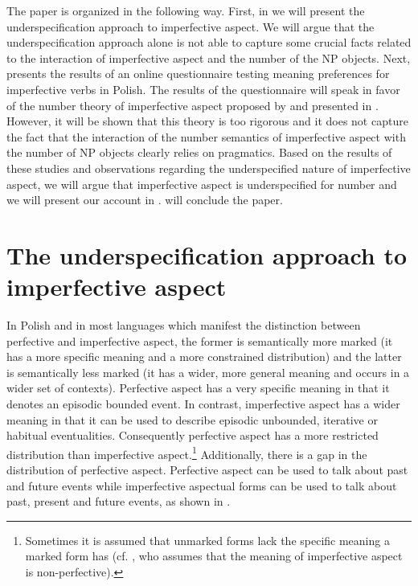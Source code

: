 \documentclass[output=paper]{langscibook}
\begin{document}
The paper is organized in the following way. First, in  we will present the underspecification approach to imperfective aspect. We will argue that the underspecification approach alone is not able to capture some crucial facts related to the interaction of imperfective aspect and the number of the NP objects. Next,  presents the results of an online questionnaire testing meaning preferences for imperfective verbs in Polish. The results of the questionnaire will speak in favor of the number theory of imperfective aspect proposed by \citet{Ferreira2004, Ferreira2005} and presented in . However, it will be shown that this theory is too rigorous and it does not capture the fact that the interaction of the number semantics of imperfective aspect with the number of NP objects clearly relies on pragmatics. Based on the results of these studies and observations regarding the underspecified nature of imperfective aspect, we will argue that imperfective aspect is underspecified for number and we will present our account in .  will conclude the paper.

\section{The underspecification approach to imperfective aspect}\label{jan-bla:fansb:kb:sec2}

In Polish and in most languages which manifest the distinction between perfective and imperfective aspect, the former is semantically more marked (it has a more specific meaning and a more constrained distribution) and the latter is semantically less marked (it has a wider, more general meaning and occurs in a wider set of contexts). Perfective aspect has a very specific meaning in that it denotes an episodic bounded event.
In contrast, imperfective aspect has a wider meaning in that it can be used to describe episodic unbounded, iterative or habitual eventualities. Consequently perfective aspect has a more restricted distribution than imperfective aspect.\footnote{Sometimes it is assumed that unmarked forms lack the specific meaning a marked form has (cf. \citealt{Borik20022006}, who assumes that the meaning of imperfective aspect is non-perfective).} Additionally, there is a gap in the distribution of perfective aspect. Perfective aspect can be used to talk about past and future events while imperfective aspectual forms can be used to talk about past, present and future events, as shown in 
.
\end{document}

